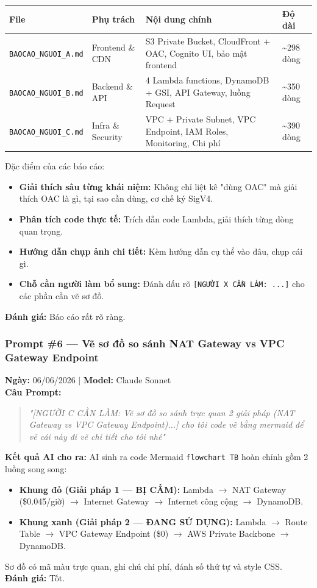 \documentclass[13pt]{article}
\begin{document}
\begin{longtable}{|p{}|p{}|p{}|p{}|}
\hline
\textbf{File} & \textbf{Phụ trách} & \textbf{Nội dung chính} & \textbf{Độ dài} \\ \hline
\endhead
\texttt{BAOCAO\_NGUOI\_A.md} & Frontend \& CDN & S3 Private Bucket, CloudFront + OAC, Cognito UI, bảo mật frontend & \textasciitilde 298 dòng \\ \hline
\texttt{BAOCAO\_NGUOI\_B.md} & Backend \& API & 4 Lambda functions, DynamoDB + GSI, API Gateway, luồng Request & \textasciitilde 350 dòng \\ \hline
\texttt{BAOCAO\_NGUOI\_C.md} & Infra \& Security & VPC + Private Subnet, VPC Endpoint, IAM Roles, Monitoring, Chi phí & \textasciitilde 390 dòng \\ \hline
\end{longtable}

Đặc điểm của các báo cáo:
\begin{itemize}
    \item \textbf{Giải thích sâu từng khái niệm:} Không chỉ liệt kê "dùng OAC" mà giải thích OAC là gì, tại sao cần dùng, cơ chế ký SigV4.
    \item \textbf{Phân tích code thực tế:} Trích dẫn code Lambda, giải thích từng dòng quan trọng.
    \item \textbf{Hướng dẫn chụp ảnh chi tiết:} Kèm hướng dẫn cụ thể vào đâu, chụp cái gì.
    \item \textbf{Chỗ cần người làm bổ sung:} Đánh dấu rõ \texttt{[NGƯỜI X CẦN LÀM: ...]} cho các phần cần vẽ sơ đồ.
\end{itemize}
\textbf{Đánh giá:} Báo cáo rất rõ ràng.

\subsubsection{Prompt \#6 — Vẽ sơ đồ so sánh NAT Gateway vs VPC Gateway Endpoint}
\textbf{Ngày:} 06/06/2026 $|$ \textbf{Model:} Claude Sonnet\\
\textbf{Câu Prompt:}
\begin{quote}
\textit{"[NGƯỜI C CẦN LÀM: Vẽ sơ đồ so sánh trực quan 2 giải pháp (NAT Gateway vs VPC Gateway Endpoint)...] cho tôi code vẽ bằng mermaid để vẽ cái này đi vẽ chi tiết cho tôi nhé"}
\end{quote}
\textbf{Kết quả AI cho ra:}
AI sinh ra code Mermaid \texttt{flowchart TB} hoàn chỉnh gồm 2 luồng song song:
\begin{itemize}
    \item \textbf{Khung đỏ (Giải pháp 1 — BỊ CẤM):} Lambda $\rightarrow$ NAT Gateway (\$0.045/giờ) $\rightarrow$ Internet Gateway $\rightarrow$ Internet công cộng $\rightarrow$ DynamoDB.
    \item \textbf{Khung xanh (Giải pháp 2 — ĐANG SỬ DỤNG):} Lambda $\rightarrow$ Route Table $\rightarrow$ VPC Gateway Endpoint (\$0) $\rightarrow$ AWS Private Backbone $\rightarrow$ DynamoDB.
\end{itemize}
Sơ đồ có mã màu trực quan, ghi chú chi phí, đánh số thứ tự và style CSS.\\
\textbf{Đánh giá:} Tốt.
\end{document}
